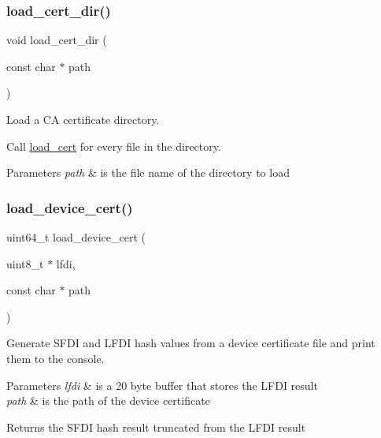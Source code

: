 \subsubsection{\texorpdfstring{load\+\_\+cert\+\_\+dir()}{load\_cert\_dir()}}
{\footnotesize\ttfamily void load\+\_\+cert\+\_\+dir (\begin{DoxyParamCaption}\item[{const char $\ast$}]{path }\end{DoxyParamCaption})}



Load a CA certificate directory. 

Call \hyperlink{group__security_gadea9b85056a9814af0f31825e3c4cfe7}{load\+\_\+cert} for every file in the directory. 
\begin{DoxyParams}{Parameters}
{\em path} & is the file name of the directory to load \\
\hline
\end{DoxyParams}
\mbox{\label{group__security_ga85dca7ededd3e531ce19183751f71ff4}} 
\subsubsection{\texorpdfstring{load\+\_\+device\+\_\+cert()}{load\_device\_cert()}}
{\footnotesize\ttfamily uint64\+\_\+t load\+\_\+device\+\_\+cert (\begin{DoxyParamCaption}\item[{uint8\+\_\+t $\ast$}]{lfdi,  }\item[{const char $\ast$}]{path }\end{DoxyParamCaption})}



Generate S\+F\+DI and L\+F\+DI hash values from a device certificate file and print them to the console. 


\begin{DoxyParams}{Parameters}
{\em lfdi} & is a 20 byte buffer that stores the L\+F\+DI result \\
\hline
{\em path} & is the path of the device certificate \\
\hline
\end{DoxyParams}
\begin{DoxyReturn}{Returns}
the S\+F\+DI hash result truncated from the L\+F\+DI result 
\end{DoxyReturn}
\mbox{\label{group__security_ga37aa027507f0512a802bc034def54576}} 
